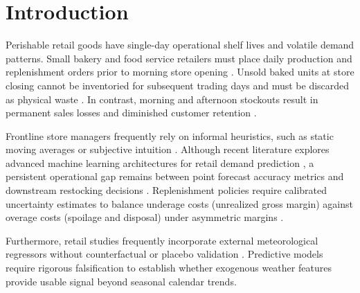 \documentclass[conference]{IEEEtran}
\begin{document}
\section{Introduction}
\label{sec:intro}
Perishable retail goods have single-day operational shelf lives and volatile demand patterns. Small bakery and food service retailers must place daily production and replenishment orders prior to morning store opening \cite{gartner2024automated}. Unsold baked units at store closing cannot be inventoried for subsequent trading days and must be discarded as physical waste \cite{chowdhury2025predictive}. In contrast, morning and afternoon stockouts result in permanent sales losses and diminished customer retention \cite{access2025supply}.

Frontline store managers frequently rely on informal heuristics, such as static moving averages or subjective intuition \cite{cherian2025demand}. Although recent literature explores advanced machine learning architectures for retail demand prediction \cite{ganguly2024enhancing, jatte2025optimization}, a persistent operational gap remains between point forecast accuracy metrics and downstream restocking decisions \cite{groene2024introduction}. Replenishment policies require calibrated uncertainty estimates to balance underage costs (unrealized gross margin) against overage costs (spoilage and disposal) under asymmetric margins \cite{avuduri2025smartstock}.

Furthermore, retail studies frequently incorporate external meteorological regressors without counterfactual or placebo validation \cite{lalitha2025enhanced, jain2024weather}. Predictive models require rigorous falsification to establish whether exogenous weather features provide usable signal beyond seasonal calendar trends.
\end{document}
